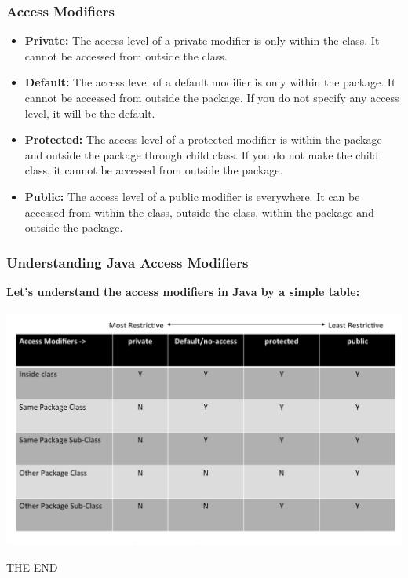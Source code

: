 \documentclass{beamer}
\begin{document}
\begin{frame}
\frametitle{Access Modifiers}
\begin{itemize}
\item \textbf{Private:} The access level of a private modifier is only within the class. It cannot be accessed from outside the class.
\item \textbf{Default:} The access level of a default modifier is only within the package. It cannot be accessed from outside the package. If you do not specify any access level, it will be the default.
\item \textbf{Protected:} The access level of a protected modifier is within the package and outside the package through child class. If you do not make the child class, it cannot be accessed from outside the package.
\item \textbf{Public:} The access level of a public modifier is everywhere. It can be accessed from within the class, outside the class, within the package and outside the package.
\end{itemize}
\end{frame}



\begin{frame}
\frametitle{Understanding Java Access Modifiers}
\textbf{Let's understand the access modifiers in Java by a simple table:}\\~\\
\includegraphics[width=\textwidth]{AccessModifier.png}
\end{frame}


\begin{frame}
\Huge{\centerline{THE END }}
\end{frame}

\end{document}
